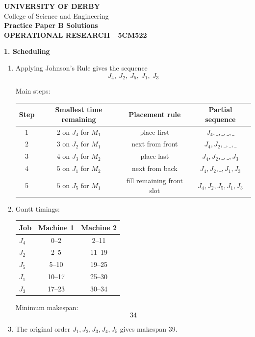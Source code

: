 \documentclass[11pt,a4paper]{article}
\newcommand{\universityname}{UNIVERSITY OF DERBY}
\newcommand{\college}{College of Science and Engineering}
\newcommand{\examtitle}{Practice Paper B Solutions}
\newcommand{\moduletitle}{OPERATIONAL RESEARCH}
\newcommand{\modulecode}{5CM522}
\begin{document}
\begin{center}
{\large \textbf{\universityname}}\\
{\college}\\[0.4em]
{\Large \textbf{\examtitle}}\\
{\large \textbf{\moduletitle} -- \textbf{\modulecode}}
\end{center}

\textbf{1. Scheduling}

\begin{enumerate}
\item Applying Johnson's Rule gives the sequence
\[
J_4,\ J_2,\ J_5,\ J_1,\ J_3
\]

Main steps:

\begin{center}
\begin{tabular}{cccc}
\toprule
Step & Smallest time remaining & Placement rule & Partial sequence \\
\midrule
1 & $2$ on $J_4$ for $M_1$ & place first & $J_4,\_,\_,\_,\_$ \\
2 & $3$ on $J_2$ for $M_1$ & next from front & $J_4,J_2,\_,\_,\_$ \\
3 & $4$ on $J_3$ for $M_2$ & place last & $J_4,J_2,\_,\_,J_3$ \\
4 & $5$ on $J_1$ for $M_2$ & next from back & $J_4,J_2,\_,J_1,J_3$ \\
5 & $5$ on $J_5$ for $M_1$ & fill remaining front slot & $J_4,J_2,J_5,J_1,J_3$ \\
\bottomrule
\end{tabular}
\end{center}

\item Gantt timings:

\begin{center}
\begin{tabular}{lcc}
\toprule
Job & Machine 1 & Machine 2 \\
\midrule
$J_4$ & 0--2 & 2--11 \\
$J_2$ & 2--5 & 11--19 \\
$J_5$ & 5--10 & 19--25 \\
$J_1$ & 10--17 & 25--30 \\
$J_3$ & 17--23 & 30--34 \\
\bottomrule
\end{tabular}
\end{center}

Minimum makespan:
\[
34
\]

\item The original order $J_1,J_2,J_3,J_4,J_5$ gives makespan 39.


\end{enumerate}
\end{document}
